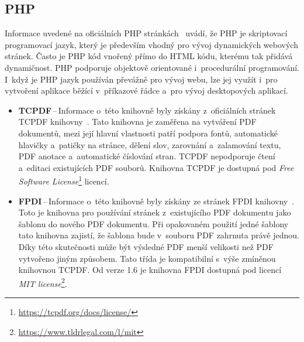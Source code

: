 \subsection*{PHP}

Informace uvedené na oficiálních PHP stránkách~\cite{PHP_is, PHP_can_do} uvádí,
že PHP je skriptovací programovací jazyk, který je především vhodný pro vývoj
dynamických webových stránek. Často je PHP kód vnořený přímo do HTML kódu, kterému
tak přidává dynamičnost. PHP podporuje objektově orientované i~procedurální 
programování. I~když je PHP jazyk používán převážně pro vývoj webu, lze jej využít
i~pro vytvoření aplikace běžící v~příkazové řádce a~pro vývoj
desktopových aplikací.

\begin{itemize}
    \item \textbf{TCPDF}\,--\,Informace o~této knihovně byly získány
    z~oficiálních stránek TCPDF kni\-hov\-ny~\cite{TCPDF}.
    Tato knihovna je zaměřena na vytváření PDF dokumentů, mezi její hlavní
    vlastnosti patří podpora fontů, automatické hlavičky a~patičky na stránce,
    dělení slov, zarovnání a~zalamování textu, PDF anotace a~automatické číslování
    stran. TCPDF nepodporuje čtení a~editaci existujících PDF souborů.
    Knihovna TCPDF je dostupná pod \emph{Free Software License}\footnote{
    \href{https://tcpdf.org/docs/license/}{https://tcpdf.org/docs/license/}
    } licencí.

    

    \item \textbf{FPDI}\,--\,Informace o~této knihovně byly získány
    ze stránek FPDI kni\-hov\-ny~\cite{FPDI}.
    Toto je knihovna pro používání stránek z~existujícího PDF dokumentu jako
    šablonu do nového PDF dokumentu. Při opakovaném použití jedné šablony tato 
    knihovna zajistí, že šablona bude v~souboru PDF zahrnuta právě jednou. Díky
    této skutečnosti může být výsledné PDF menší velikosti než PDF vytvořeno jiným
    způsobem. Tato třída je kompatibilní s~výše zmíněnou knihovnou TCPDF. Od verze
    1.6 je knihovna FPDI dostupná pod licencí \emph{MIT license}\footnote{
    \href{https://www.tldrlegal.com/l/mit}{https://www.tldrlegal.com/l/mit}
    }.

\end{itemize}



